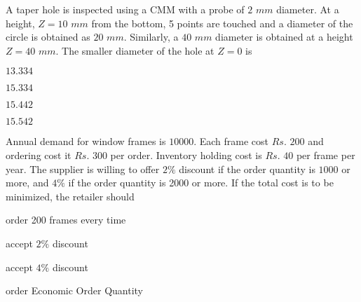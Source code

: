 \item A taper hole is inspected using a CMM with a probe of $2$ $mm$ diameter. At a height, $Z=10$ $mm$ from the bottom, 5 points are touched and a diameter of the circle  is obtained as $20$ $mm$. Similarly, a $40$ $mm$ diameter is obtained at a height $Z=40$ $mm$. The smaller diameter  of the hole at $Z=0$ is
\\\begin{center}
\end{center}
\hfill{}
\begin{enumerate}
\begin{multicols}{4}
\item $13.334$
\item $15.334$
\item $15.442$
\item $15.542$
\end{multicols}
\end{enumerate}

\item Annual demand for window frames is $10000$. Each frame cost $Rs.$ $200$ and ordering cost it $Rs.$ $300$ per order. Inventory holding cost is $Rs.$ $40$ per frame per year. The supplier is willing to offer $2\%$ discount if the order quantity is $1000$ or more, and $4\%$ if the order quantity is 2000 or more. If the total cost is to be minimized, the retailer should

\hfill{}
\begin{enumerate}
\begin{multicols}{2}
\item order 200 frames every time
\item accept $2\%$ discount
\item accept $4\%$ discount
\item order Economic Order Quantity
\end{multicols}
\end{enumerate}

